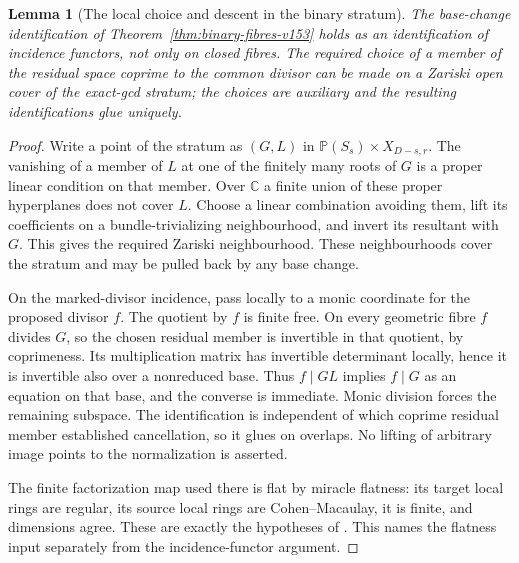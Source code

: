 \documentclass[11pt,reqno]{amsart}
\numberwithin{equation}{section}
\newtheorem{lemma}[theorem]{Lemma}
\theoremstyle{definition}\newtheorem{definition}[theorem]{Definition}
\theoremstyle{remark}\newtheorem{remark}[theorem]{Remark}
\newcommand{\C}{\mathbb C}\newcommand{\Q}{\mathbb Q}
\newcommand{\Pj}{\mathbb P}\newcommand{\A}{\mathbb A}
\begin{document}
\begin{lemma}[The local choice and descent in the binary stratum]
\label{lem:residual-selection-v154}
The base-change identification of
Theorem~\ref{thm:binary-fibres-v153} holds as an identification of
incidence functors, not only on closed fibres. The required choice
of a member of the residual space coprime to the common divisor can
be made on a Zariski open cover of the exact-gcd stratum; the choices
are auxiliary and the resulting identifications glue uniquely.
\end{lemma}
\begin{proof}
Write a point of the stratum as $(G,L)$ in
$\Pj(S_s)\times X_{D-s,r}$. The vanishing of a member of $L$ at
one of the finitely many roots of $G$ is a proper linear condition
on that member. Over $\C$ a finite union of these proper hyperplanes
does not cover $L$. Choose a linear combination avoiding them, lift
its coefficients on a bundle-trivializing neighbourhood, and invert
its resultant with $G$. This gives the required Zariski neighbourhood.
These neighbourhoods cover the stratum and may be pulled back by
any base change.

On the marked-divisor incidence, pass locally to a monic coordinate
for the proposed divisor $f$. The quotient by $f$ is finite free.
On every geometric fibre $f$ divides $G$, so the chosen residual
member is invertible in that quotient, by coprimeness. Its
multiplication matrix has invertible determinant locally, hence it
is invertible also over a nonreduced base. Thus $f\mid G L$ implies
$f\mid G$ as an equation on that base, and the converse is immediate.
Monic division forces the remaining subspace. The identification is
independent of which coprime residual member established cancellation,
so it glues on overlaps. No lifting of arbitrary image points to the
normalization is asserted.

The finite factorization map used there is flat by miracle flatness:
its target local rings are regular, its source local rings are
Cohen--Macaulay, it is finite, and dimensions agree. These are exactly
the hypotheses of \cite[Tag 00R4]{StacksLocalV154}. This names the
flatness input separately from the incidence-functor argument.
\end{proof}
\end{document}
